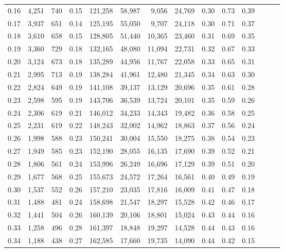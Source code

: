 \begin{tabular}{rrrrrrrrrrrrrr}
0.16 &   4,251 &  740 &  0.15 &  121,258 &   58,987 &   9,056 &  24,769 &  0.30 &  0.73 &      0.39 \\
0.17 &   3,937 &  651 &  0.14 &  125,195 &   55,050 &   9,707 &  24,118 &  0.30 &  0.71 &      0.37 \\
0.18 &   3,610 &  658 &  0.15 &  128,805 &   51,440 &  10,365 &  23,460 &  0.31 &  0.69 &      0.35 \\
0.19 &   3,360 &  729 &  0.18 &  132,165 &   48,080 &  11,094 &  22,731 &  0.32 &  0.67 &      0.33 \\
0.20 &   3,124 &  673 &  0.18 &  135,289 &   44,956 &  11,767 &  22,058 &  0.33 &  0.65 &      0.31 \\
0.21 &   2,995 &  713 &  0.19 &  138,284 &   41,961 &  12,480 &  21,345 &  0.34 &  0.63 &      0.30 \\
0.22 &   2,824 &  649 &  0.19 &  141,108 &   39,137 &  13,129 &  20,696 &  0.35 &  0.61 &      0.28 \\
0.23 &   2,598 &  595 &  0.19 &  143,706 &   36,539 &  13,724 &  20,101 &  0.35 &  0.59 &      0.26 \\
0.24 &   2,306 &  619 &  0.21 &  146,012 &   34,233 &  14,343 &  19,482 &  0.36 &  0.58 &      0.25 \\
0.25 &   2,231 &  619 &  0.22 &  148,243 &   32,002 &  14,962 &  18,863 &  0.37 &  0.56 &      0.24 \\
0.26 &   1,998 &  588 &  0.23 &  150,241 &   30,004 &  15,550 &  18,275 &  0.38 &  0.54 &      0.23 \\
0.27 &   1,949 &  585 &  0.23 &  152,190 &   28,055 &  16,135 &  17,690 &  0.39 &  0.52 &      0.21 \\
0.28 &   1,806 &  561 &  0.24 &  153,996 &   26,249 &  16,696 &  17,129 &  0.39 &  0.51 &      0.20 \\
0.29 &   1,677 &  568 &  0.25 &  155,673 &   24,572 &  17,264 &  16,561 &  0.40 &  0.49 &      0.19 \\
0.30 &   1,537 &  552 &  0.26 &  157,210 &   23,035 &  17,816 &  16,009 &  0.41 &  0.47 &      0.18 \\
0.31 &   1,488 &  481 &  0.24 &  158,698 &   21,547 &  18,297 &  15,528 &  0.42 &  0.46 &      0.17 \\
0.32 &   1,441 &  504 &  0.26 &  160,139 &   20,106 &  18,801 &  15,024 &  0.43 &  0.44 &      0.16 \\
0.33 &   1,258 &  496 &  0.28 &  161,397 &   18,848 &  19,297 &  14,528 &  0.44 &  0.43 &      0.16 \\
0.34 &   1,188 &  438 &  0.27 &  162,585 &   17,660 &  19,735 &  14,090 &  0.44 &  0.42 &      0.15 \\

\end{tabular}
